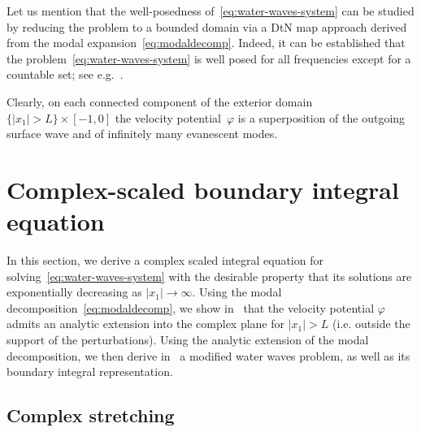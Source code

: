 \documentclass[review,hidelinks,onefignum,onetabnum]{siamart220329}
\newcommand{\R}{\mathbb{R}}
\newcommand{\C}{\mathbb{C}}
\newcommand{\bx}{\mathbf{x}}
\newcommand{\tvarphi}{\widetilde \varphi}
\begin{document}
Let us mention that the well-posedness of~\eqref{eq:water-waves-system} can be studied by reducing the problem to a bounded domain via a DtN map approach derived from the modal expansion~\eqref{eq:modaldecomp}. Indeed, it can be established that the problem~\eqref{eq:water-waves-system} is well posed for all frequencies except for a countable set; see e.g.~\cite{thomas1977eigenfunction}.

Clearly, on each connected component of the exterior domain $\{|x_1|>L\}\times[-1,0]$ the velocity potential~$\varphi$ is a superposition of the outgoing surface wave and of infinitely many evanescent modes. 

\section{Complex-scaled boundary integral equation}\label{sec:complex-scaled-formulation}

In this section, we derive a complex scaled integral equation for solving~\cref{eq:water-waves-system} with the desirable 
property that its solutions are exponentially decreasing as $|x_1| \to \infty$.
Using the modal decomposition~\cref{eq:modaldecomp}, we show
in~ that the velocity potential $\varphi$ admits an analytic extension into the complex plane for $|x_1| > L$ (i.e. outside the support of the perturbations). Using the analytic extension of the modal decomposition, we then derive in~ a modified water waves problem, as well as its boundary integral representation.


\subsection{Complex stretching}\label{sec:complex-stretching}
\end{document}

